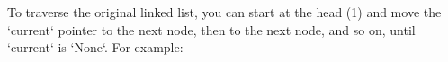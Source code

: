 \documentclass[preview]{standalone}
\begin{document}
To traverse the original linked list, you can start at the head (1) and move the `current` pointer to the next node, then to the next node, and so on, until `current` is `None`. For example:\\
\end{document}
